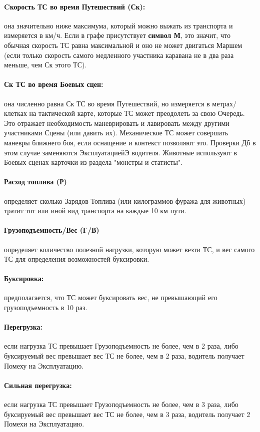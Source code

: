 \paragraph{Cкорость ТС во время Путешествий (Ск):} она значительно ниже максимума, который можно выжать из транспорта и измеряется в км/ч. 
\newline Если в графе присутствует \textbf{символ М}, это значит, что обычная скорость ТС равна максимальной и оно не может двигаться Маршем (если только скорость самого медленного участника каравана не в два раза меньше, чем Ск этого ТС).
\paragraph{Ск ТС во время Боевых сцен:} она численно равна Ск ТС во время Путешествий, но измеряется в метрах/клетках на тактической карте, которые ТС может преодолеть за свою Очередь. Это отражает необходимость маневрировать и лавировать между другими участниками Сцены (или давить их). Механическое ТС может совершать маневры ближнего боя, если оснащение и контекст позволяют это. Проверки Дб в этом случае заменяются ЭксплуатациейЭ водителя.
Животные используют в Боевых сценах карточки из раздела "монстры и статисты".
\paragraph{Расход топлива (Р)} определяет сколько Зарядов Топлива (или килограммов фуража для животных) тратит тот или иной вид транспорта на каждые 10 км пути.
\paragraph{Грузоподъемность/Вес (Г/В)} определяет количество полезной нагрузки, которую может везти ТС, и вес самого ТС для определения возможностей буксировки.
\paragraph{Буксировка:} предполагается, что ТС может буксировать вес, не превышающий его грузоподъемность в 10 раз.
\paragraph{Перегрузка:} если нагрузка ТС превышает Грузоподъемность не более, чем в 2 раза, либо буксируемый вес превышает вес ТС не более, чем в 2 раза, водитель получает Помеху на Эксплуатацию.
\paragraph{Сильная перегрузка:} если нагрузка ТС превышает Грузоподъемность не более, чем в 3 раза, либо буксируемый вес превышает вес ТС не более, чем в 3 раза, водитель получает 2 Помехи на Эксплуатацию.
